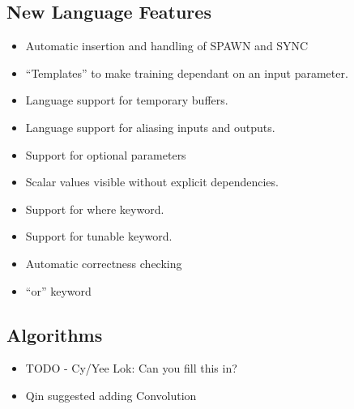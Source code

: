 \documentclass[11pt]{article}
\begin{document}
\subsection{New Language Features}
\begin{itemize}

\item Automatic insertion and handling of SPAWN and SYNC

\item ``Templates'' to make training dependant on an input parameter.

\item Language support for temporary buffers.

\item Language support for aliasing inputs and outputs.

\item Support for optional parameters

\item Scalar values visible without explicit dependencies.

\item Support for where keyword.

\item Support for tunable keyword.

\item Automatic correctness checking

\item ``or'' keyword

\end{itemize}

\subsection{Algorithms}
\begin{itemize}

\item TODO - Cy/Yee Lok: Can you fill this in?

\item Qin suggested adding Convolution

\end{itemize}
\end{document}
